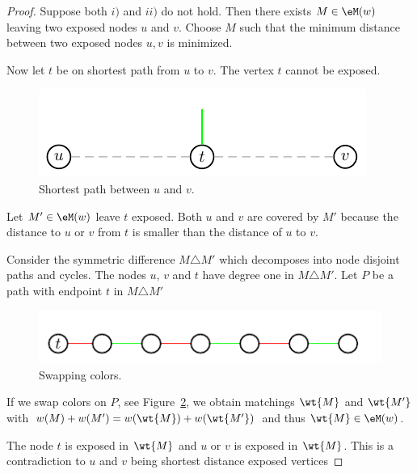 \begin{proof}
Suppose both $i)$ and $ii)$ do not hold.
Then there exists ${ M}\in \eM(w)$ leaving two exposed nodes $u$ and
$v$.  Choose $ M$ such that the  minimum  distance between   two exposed nodes
  $u,v$ is  minimized. 


Now let $t$ be on shortest path from $u$ to $v$. The vertex $t$ cannot
be exposed. 
\begin{figure}[htbp]
  \centering
    \begin{center}    
    \includegraphics{figures/PicPolyhedra5.pdf}
  \end{center}
  \caption{Shortest path between $u$ and $v$. }
  \label{po:fig:short}
\end{figure}


 Let ${ M'} \in \eM(w)$ leave $t$ exposed. 
 Both $u$ and $v$ are covered by  ${ M'}$ because the distance to
 $u$ or $v$ from $t$ is smaller than the distance of $u$ to $v$. 
 
 Consider the symmetric difference ${ M} \triangle { M'}$ which  decomposes into
 node disjoint paths and   cycles. 
The  nodes $u, \, v$ and $t$ have degree one in ${M}\triangle{ M'}$. Let 
$P$ be a  path with endpoint $t$ in ${ M}\triangle{ M'}$


\begin{figure}
  \centering
    
\includegraphics{figures/PicPolyhedra6.pdf}
\caption{Swapping colors. }\label{fig:2}
\end{figure}




 If we swap colors on $P$, see Figure~\ref{fig:2}, we obtain matchings  ${\wt{M}}$ and
 ${\wt{M'}}$ with 
 $w({ M}) + w({ M'}) = w({ \wt{M}})+w({  \wt{M'}}) $ and thus
 ${ \wt{M}} \in \eM(w)$.  

 The node $t$ is exposed in ${\wt{M}}$ and $u$ or $v$ is exposed  in
  ${\wt{M}}$. This is a  
contradiction to $u$ and $v$ being shortest distance exposed
  vertices 


\end{proof}



